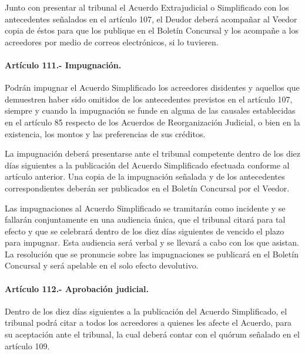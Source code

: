 \documentclass[
]{book}
\begin{document}
Junto con presentar al tribunal el Acuerdo Extrajudicial o Simplificado con los antecedentes señalados en el artículo 107, el Deudor deberá acompañar al Veedor copia de éstos para que los publique en el Boletín Concursal y los acompañe a los acreedores por medio de correos electrónicos, si lo tuvieren.

\hypertarget{artuxedculo-111.--impugnaciuxf3n.}{%
\paragraph*{Artículo 111.- Impugnación.}\label{artuxedculo-111.--impugnaciuxf3n.}}

Podrán impugnar el Acuerdo Simplificado los acreedores disidentes y aquellos que demuestren haber sido omitidos de los antecedentes previstos en el artículo 107, siempre y cuando la impugnación se funde en alguna de las causales establecidas en el artículo 85 respecto de los Acuerdos de Reorganización Judicial, o bien en la existencia, los montos y las preferencias de sus créditos.

La impugnación deberá presentarse ante el tribunal competente dentro de los diez días siguientes a la publicación del Acuerdo Simplificado efectuada conforme al artículo anterior. Una copia de la impugnación señalada y de los antecedentes correspondientes deberán ser publicados en el Boletín Concursal por el Veedor.

Las impugnaciones al Acuerdo Simplificado se tramitarán como incidente y se fallarán conjuntamente en una audiencia única, que el tribunal citará para tal efecto y que se celebrará dentro de los diez días siguientes de vencido el plazo para impugnar. Esta audiencia será verbal y se llevará a cabo con los que asistan. La resolución que se pronuncie sobre las impugnaciones se publicará en el Boletín Concursal y será apelable en el solo efecto devolutivo.

\hypertarget{artuxedculo-112.--aprobaciuxf3n-judicial.}{%
\paragraph*{Artículo 112.- Aprobación judicial.}\label{artuxedculo-112.--aprobaciuxf3n-judicial.}}

Dentro de los diez días siguientes a la publicación del Acuerdo Simplificado, el tribunal podrá citar a todos los acreedores a quienes les afecte el Acuerdo, para su aceptación ante el tribunal, la cual deberá contar con el quórum señalado en el artículo 109.
\end{document}
